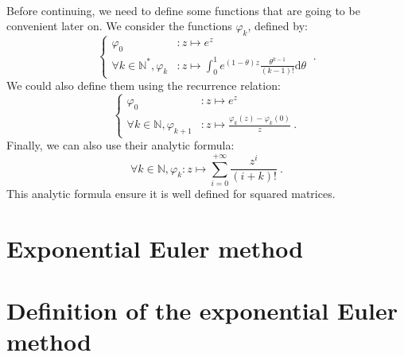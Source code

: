     \paragraph{}
    Before continuing, we need to define some functions that are going to be convenient later on.
    We consider the functions $\varphi_k$, defined by:
    \begin{equation}
      \left\{\begin{aligned}
        \varphi_0 &: z \mapsto e^z \\
        \forall k \in \mathbb{N}^*, \varphi_{k} &: z \mapsto \int_0^1 e^{\left(1 - \theta\right)z} \frac{\theta^{k-1}}{\left(k-1\right)!} \mathrm{d}\theta
      \end{aligned}\right.\ .
    \end{equation}
    We could also define them using the recurrence relation:
    \begin{equation}
      \left\{\begin{aligned}
        \varphi_0 &: z \mapsto e^z \\
        \forall k \in \mathbb{N}, \varphi_{k+1} &: z \mapsto \frac{\varphi_k\left(z\right) - \varphi_k\left(0\right)}{z} \ .
      \end{aligned}\right.
    \end{equation}
    Finally, we can also use their analytic formula:
    \begin{equation}
      \forall k \in \mathbb{N}, \varphi_{k} : z \mapsto \sum_{i = 0}^{+\infty} \frac{z^i}{\left(i + k\right)!} \ .
    \end{equation}
    This analytic formula ensure it is well defined for squared matrices.


  \section{Exponential Euler method}

    \section{Definition of the exponential Euler method}

